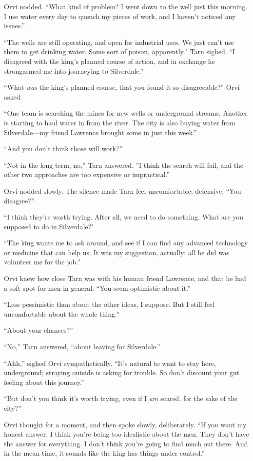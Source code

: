 Orvi nodded.  ``What kind of problem? I went down to the well just this morning.  I use water every day to quench my pieces of work, and I haven't noticed any issues.''

``The wells are still operating, and open for industrial uses.  We just can't use them to get drinking water.  Some sort of poison, apparently."  Tarn sighed.  ``I disagreed with the king's planned course of action, and in exchange he strongarmed me into journeying to Silverdale.''

``What \emph{was} the king's planned course, that you found it so disagreeable?'' Orvi asked.

``One team is searching the mines for new wells or underground streams.  Another is starting to haul water in from the river.  The city is also buying water from Silverdale---my friend Lawrence brought some in just this week.''

``And you don't think those will work?''

``Not in the long term, no,'' Tarn answered.  ''I think the search will fail, and the other two approaches are too expensive or impractical.''

Orvi nodded slowly.  The silence made Tarn feel uncomfortable; defensive.  ``You disagree?''

``I think they're worth trying.  After all, we need to do something.  What are you supposed to do in Silverdale?"

``The king wants me to ask around, and see if I can find any advanced technology or medicine that can help us.  It was my suggestion, actually; all he did was volunteer me for the job.''

Orvi knew how close Tarn was with his human friend Lawrence, and that he had a soft spot for men in general.  ``You seem optimistic about it.''

``Less pessimistic than about the other ideas, I suppose.  But I still feel uncomfortable about the whole thing."

``About your chances?''

``No,'' Tarn answered, ``about leaving for Silverdale.''

``Ahh,'' sighed Orvi sympathetically.  ``It's natural to want to stay here, underground; straying outside is asking for trouble.  So don't discount your gut feeling about this journey.''

``But don't you think it's worth trying, even if I \emph{am} scared, for the sake of the city?''

Orvi thought for a moment, and then spoke slowly, deliberately.  ``If you want my honest answer, I think you're being too idealistic about the men.  They don't have the answer for everything.  I don't think you're going to find much out there.  And in the mean time, it sounds like the king has things under control.''

